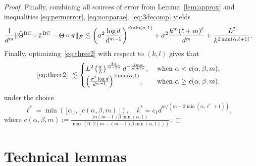 \documentclass[11pt]{article}
\theoremstyle{definition}
\begin{document}
\begin{proof}
Finally, combining all sources of error from Lemma~\ref{lem:approx} and inequalities \eqref{eq:permerror}, \eqref{eq:nonparae}, \eqref{eq:3decomp} yields
\begin{align}\label{eq:three2}
    \frac{1}{d^m} \lVert\hat\Theta^{\text{BC}}\circ \hat\pi^{\text{BC}}-\Theta\circ\pi\rVert_F\lesssim \left(\sigma^2{\log d\over d^{m-1}}\right)^{\beta{\min(\alpha,1)}}+ \sigma^2 \frac{k^m(\ell+m)^\ell}{d^m}+ \frac{L^2}{k^{2\min(\alpha,\ell+1)}}.
\end{align}
Finally, optimizing~\eqref{eq:three2} with respect to $(k,l)$ gives that 
\begin{align}
     \eqref{eq:three2}\ \lesssim 
     \begin{cases} 
    L^2\left({\sigma\over L}\right)^{4\alpha\over m+2\alpha} d^{-\frac{2m\alpha}{m+2\alpha}}, & \text{ when } \alpha <c(\alpha,\beta,m),\\
    \left( \sigma^2 \log d\over d^{m-1}\right)^{\beta\min(\alpha,1)}, &\text{ when } \alpha \geq c(\alpha,\beta,m),
    \end{cases}
\end{align}
under the choice
\[
\ell^* = \min\left(\lfloor\alpha\rfloor,\lfloor c(\alpha,\beta,m)\rfloor\right),\quad k^* = c_1d^{m/ (m+2\min(\alpha,\ell^*+1))},
\]
where $c(\alpha,\beta,m):= \frac{m(m-1)\beta\min(\alpha,1)}{\max(0,\ 2(m-(m-1)\beta\min(\alpha,1)))}$.

\end{proof}


\section{Technical lemmas}\label{sec:tech}
\end{document}
